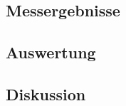 \documentclass[12pt,a4paper]{article}
\begin{document}
\subsection{Messergebnisse}
\subsection{Auswertung}
\subsection{Diskussion}
\end{document}
